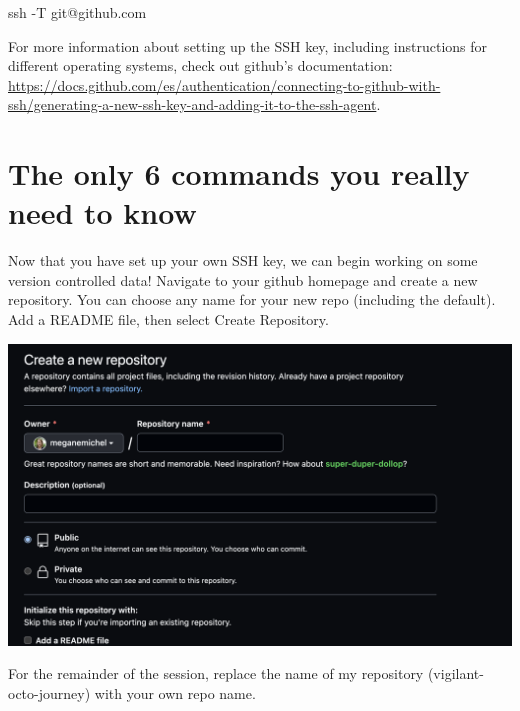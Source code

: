 \documentclass[
  letterpaper,
]{book}
\newenvironment{Shaded}{}{}
\newcommand{\AttributeTok}[1]{\textcolor[rgb]{0.84,0.23,0.29}{#1}}
\newcommand{\FunctionTok}[1]{\textcolor[rgb]{0.44,0.26,0.76}{#1}}
\newcommand{\NormalTok}[1]{\textcolor[rgb]{0.14,0.16,0.18}{#1}}
\begin{document}
\begin{Shaded}
\begin{Highlighting}[]
\FunctionTok{ssh} \AttributeTok{{-}T}\NormalTok{ git@github.com}
\end{Highlighting}
\end{Shaded}

For more information about setting up the SSH key, including
instructions for different operating systems, check out github's
documentation:
\url{https://docs.github.com/es/authentication/connecting-to-github-with-ssh/generating-a-new-ssh-key-and-adding-it-to-the-ssh-agent}.

\hypertarget{the-only-6-commands-you-really-need-to-know}{%
\section{The only 6 commands you really need to
know}\label{the-only-6-commands-you-really-need-to-know}}

Now that you have set up your own SSH key, we can begin working on some
version controlled data! Navigate to your github homepage and create a
new repository. You can choose any name for your new repo (including the
default). Add a README file, then select Create Repository.

\includegraphics{assets/images/chapters/introduction-to-git/create_repo.png}

\begin{tcolorbox}[enhanced jigsaw, opacitybacktitle=0.6, bottomtitle=1mm, opacityback=0, colback=white, coltitle=black, leftrule=.75mm, toprule=.15mm, title=\textcolor{quarto-callout-note-color}{\faInfo}\hspace{0.5em}{Note}, colframe=quarto-callout-note-color-frame, toptitle=1mm, arc=.35mm, left=2mm, titlerule=0mm, breakable, rightrule=.15mm, bottomrule=.15mm, colbacktitle=quarto-callout-note-color!10!white]

For the remainder of the session, replace the name of my repository
(vigilant-octo-journey) with your own repo name.

\end{tcolorbox}
\end{document}
